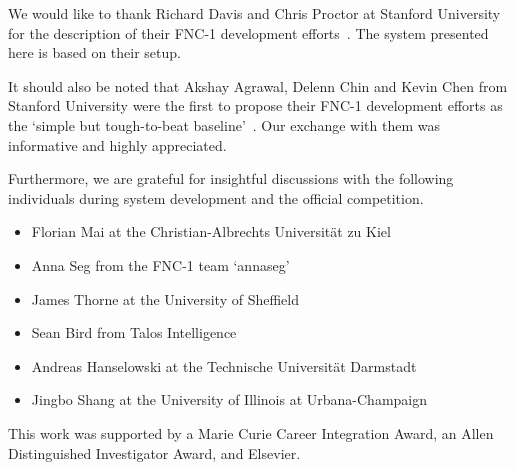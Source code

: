 \documentclass{article}
\begin{document}
We would like to thank Richard Davis and Chris Proctor at Stanford University for the description of their FNC-1 development efforts~\cite{stanford}. The system presented here is based on their setup.

It should also be noted that Akshay Agrawal, Delenn Chin and Kevin Chen from Stanford University were the first to propose their FNC-1 development efforts as the ‘simple but tough-to-beat baseline’~\cite{stanford2}. Our exchange with them was informative and highly appreciated.

Furthermore, we are grateful for insightful discussions with the following individuals during system development and the official competition.

\begin{itemize}
    \item Florian Mai at the Christian-Albrechts Universität zu Kiel
    \item Anna Seg from the FNC-1 team `annaseg'
    \item James Thorne at the University of Sheffield
    \item Sean Bird from Talos Intelligence
    \item Andreas Hanselowski at the Technische Universität Darmstadt
    \item Jingbo Shang at the University of Illinois at Urbana-Champaign
\end{itemize}

This work was supported by a Marie Curie Career Integration Award, an Allen Distinguished Investigator Award, and Elsevier. 


\end{document}
